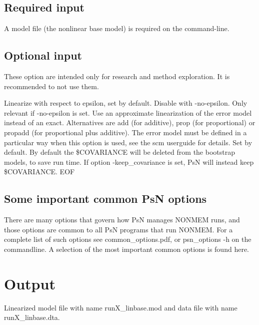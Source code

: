 \subsection{Required input}
A model file (the nonlinear base model) is required on the command-line.

\subsection{Optional input}
These option are intended only for research and method exploration.
It is recommended to not use them.
\begin{optionlist}
Linearize with respect to epsilon, set by default. Disable with -no-epsilon.
\nextopt
{}
Only relevant if -no-epsilon is set. 
Use an approximate linearization of the error model instead of an exact.
Alternatives are add (for additive), prop (for proportional) or
propadd (for proportional plus additive).
The error model must be defined in a particular way when this option is used,
see the scm userguide for details.
\nextopt
{}
Set by default. 
\nextopt
{}
      By default the \$COVARIANCE will be deleted from the bootstrap models, 
	  to save run time. If option -keep\_covariance is set, 
	  PsN will instead keep \$COVARIANCE.
\nextopt
EOF

\end{optionlist}

\subsection{Some important common PsN options}
There are many options that govern how PsN manages NONMEM runs, and
those options are common to all PsN programs that run NONMEM.
For a complete list of such options see common\_options.pdf, 
or psn\_options -h on the commandline. A selection of
the most important common options is found here.



\section{Output}
Linearized model file with name runX\_linbase.mod and data file with name runX\_linbase.dta.



